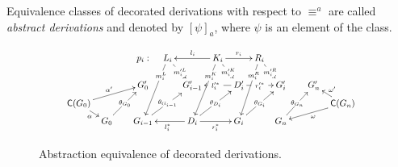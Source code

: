  Equivalence classes of decorated derivations 
  with respect to $\equiv^{a}$ 
  are called \emph{abstract derivations} and 
  denoted by
  $[\psi]_{a}$, where $\psi$ is an element of the class.

\begin{figure}
\vspace{-1.1cm}

\[
\scalebox{.8}{
\xymatrix@R=1.4mm@C=2mm{ 
  & & & {p_i:} & {L_i} \ar[ddddl]|/-6mm/{\bx{m_i^L}} \ar[ddr]|{\bx{m_i'^L}} & & {K_i}
  \ar[ll]_{l_i} \ar[rr]^{r_i} \ar[ddddl]|/-6mm/{\bx{m_i^K}} \ar[ddr]|{\bx{m_i'^K}} & &
  {R_i} \ar[ddddl]|/-6mm/{\bx{m_i^R}} \ar[ddr]|{\bx{m_i'^R}}& & & &\\
  & & & & & & & & & & &\\  
  & & & {G_0'} & & {G_{i-1}'} & &
  {D_i'} \ar[ll]|{\bx{l_i'^*}} \ar[rr]|{\bx{r_i'^*}} & & {G_{i}'} & & {G_n'} &\\
  {\can{G_0}} \ar[urrr]^{\alpha'} \ar[dr]_{\alpha}  & & & & & & & & & & & &
  {\can{G_n}} \ar[ul]_{\omega'} \ar[dlll]^{\omega} \\
  & {G_0} \ar[uurr]|{\theta_{G_0}} &  & {G_{i-1}} \ar[uurr]|{\theta_{G_{i-1}}} & &
  {D_i} \ar[ll]^{l_i^*} \ar[rr]_{r_i^*} \ar[uurr]|{\theta_{D_i}} & &
  G_{i} \ar[uurr]|{\theta_{G_{i}}} & & {G_n} \ar[uurr]|{\theta_{G_n}} & & }
}
\]

\caption{Abstraction equivalence of decorated derivations.}
\label{fi:der-iso}
\end{figure}


%  


